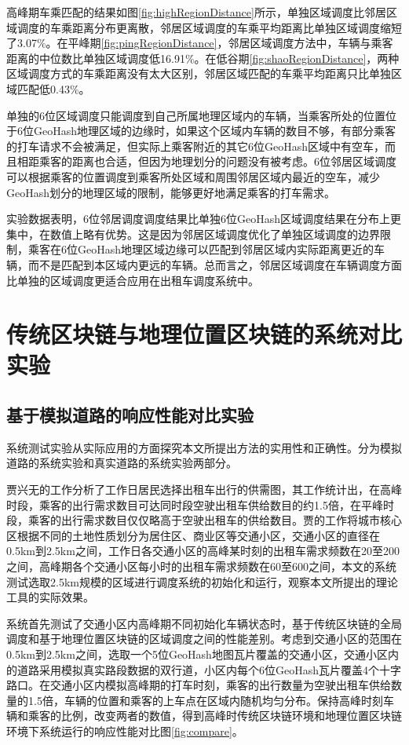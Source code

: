 高峰期车乘匹配的结果如图\ref{fig:highRegionDistance}所示，单独区域调度比邻居区域调度的车乘距离分布更离散，邻居区域调度的车乘平均距离比单独区域调度缩短了3.07$\%$。在平峰期\ref{fig:pingRegionDistance}，邻居区域调度方法中，车辆与乘客距离的中位数比单独区域调度低16.91$\%$。在低谷期\ref{fig:shaoRegionDistance}，两种区域调度方式的车乘距离没有太大区别，邻居区域匹配的车乘平均距离只比单独区域匹配低0.43$\%$。

单独的6位区域调度只能调度到自己所属地理区域内的车辆，当乘客所处的位置位于6位GeoHash地理区域的边缘时，如果这个区域内车辆的数目不够，有部分乘客的打车请求不会被满足，但实际上乘客附近的其它6位GeoHash区域中有空车，而且相距乘客的距离也合适，但因为地理划分的问题没有被考虑。6位邻居区域调度可以根据乘客的位置调度到乘客所处区域和周围邻居区域内最近的空车，减少GeoHash划分的地理区域的限制，能够更好地满足乘客的打车需求。

实验数据表明，6位邻居调度调度结果比单独6位GeoHash区域调度结果在分布上更集中，在数值上略有优势。这是因为邻居区域调度优化了单独区域调度的边界限制，乘客在6位GeoHash地理区域边缘可以匹配到邻居区域内实际距离更近的车辆，而不是匹配到本区域内更远的车辆。总而言之，邻居区域调度在车辆调度方面比单独的区域调度更适合应用在出租车调度系统中。

\section{传统区块链与地理位置区块链的系统对比实验}
\subsection{基于模拟道路的响应性能对比实验}
系统测试实验从实际应用的方面探究本文所提出方法的实用性和正确性。分为模拟道路的系统实验和真实道路的系统实验两部分。

贾兴无的工作分析了工作日居民选择出租车出行的供需图，其工作统计出，在高峰时段，乘客的出行需求数目可达同时段空驶出租车供给数目的约1.5倍，在平峰时段，乘客的出行需求数目仅仅略高于空驶出租车的供给数目。贾的工作将城市核心区根据不同的土地性质划分为居住区、商业区等交通小区，交通小区的直径在0.5km到2.5km之间，工作日各交通小区的高峰某时刻的出租车需求频数在20至200之间，高峰期各个交通小区每小时的出租车需求频数在60至600之间，本文的系统测试选取2.5km规模的区域进行调度系统的初始化和运行，观察本文所提出的理论工具的实际效果。

系统首先测试了交通小区内高峰期不同初始化车辆状态时，基于传统区块链的全局调度和基于地理位置区块链的区域调度之间的性能差别。考虑到交通小区的范围在0.5km到2.5km之间，选取一个5位GeoHash地图瓦片覆盖的交通小区，交通小区内的道路采用模拟真实路段数据的双行道，小区内每个6位GeoHash瓦片覆盖4个十字路口。在交通小区内模拟高峰期的打车时刻，乘客的出行数量为空驶出租车供给数量的1.5倍，车辆的位置和乘客的上车点在区域内随机均匀分布。保持高峰时刻车辆和乘客的比例，改变两者的数值，得到高峰时传统区块链环境和地理位置区块链环境下系统运行的响应性能对比图\ref{fig:compare}。

